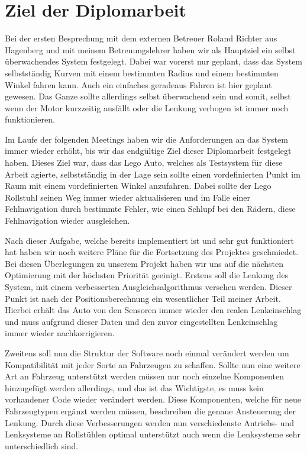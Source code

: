 \section{Ziel der Diplomarbeit}
Bei der ersten Besprechung mit dem externen Betreuer Roland Richter aus Hagenberg und mit meinem Betreuungslehrer haben wir als Hauptziel ein selbst überwachendes System festgelegt.
Dabei war vorerst nur geplant, dass das System selbstständig Kurven mit einem bestimmten Radius und einem bestimmten Winkel fahren kann.
Auch ein einfaches geradeaus Fahren ist hier geplant gewesen.
Das Ganze sollte allerdings selbst überwachend sein und somit, selbst wenn der Motor kurzzeitig ausfällt oder die Lenkung verbogen ist immer noch funktionieren.

Im Laufe der folgenden Meetings haben wir die Anforderungen an das System immer wieder erhöht, bis wir das endgültige Ziel dieser Diplomarbeit festgelegt haben.
Dieses Ziel war, dass das Lego Auto, welches als Testsystem für diese Arbeit agierte, selbstständig in der Lage sein sollte einen vordefinierten Punkt im Raum mit einem vordefinierten Winkel anzufahren.
Dabei sollte der Lego Rollstuhl seinen Weg immer wieder aktualisieren und im Falle einer Fehlnavigation durch bestimmte Fehler, wie einen Schlupf bei den Rädern, diese Fehlnavigation wieder ausgleichen.

Nach dieser Aufgabe, welche bereits implementiert ist und sehr gut funktioniert hat haben wir noch weitere Pläne für die Fortsetzung des Projektes geschmiedet.
Bei diesen Überlegungen zu unserem Projekt haben wir uns auf die nächsten Optimierung mit der höchsten Priorität geeinigt.
Erstens soll die Lenkung des System, mit einem verbesserten Ausgleichsalgorithmus versehen werden.
Dieser Punkt ist nach der Positionsberechnung ein wesentlicher Teil meiner Arbeit.
Hierbei erhält das Auto von den Sensoren immer wieder den realen Lenkeinschlag und muss aufgrund dieser Daten und den zuvor eingestellten Lenkeinschlag immer wieder nachkorrigieren.

Zweitens soll nun die Struktur der Software noch einmal verändert werden um Kompatibilität mit jeder Sorte an Fahrzeugen zu schaffen.
Sollte nun eine weitere Art an Fahrzeug unterstützt werden müssen nur noch einzelne Komponenten hinzugefügt werden allerdings, und das ist das Wichtigste, es muss kein vorhandener Code wieder verändert werden.
Diese Komponenten, welche für neue Fahrzeugtypen ergänzt werden müssen, beschreiben die genaue Ansteuerung der Lenkung.
Durch diese Verbesserungen werden nun verschiedenste Antriebs- und Lenksysteme an Rollstühlen optimal unterstützt auch wenn die Lenksysteme sehr unterschiedlich sind.


